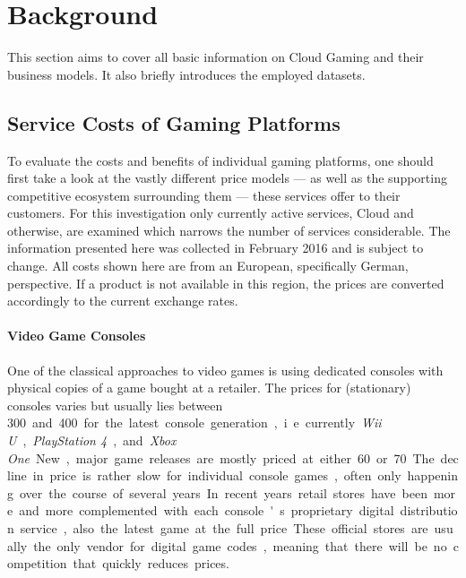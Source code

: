 \section{Background}
\label{sec:background}

This section aims to cover all basic information on Cloud Gaming and their business models. It also briefly introduces the employed datasets.

\subsection{Service Costs of Gaming Platforms}

To evaluate the costs and benefits of individual gaming platforms, one should first take a look at the vastly different price models --- as well as the supporting competitive ecosystem surrounding them --- these services offer to their customers. For this investigation only currently active services, Cloud and otherwise, are examined which narrows the number of services considerable. The information presented here was collected in February 2016 and is subject to change. All costs shown here are from an European, specifically German, perspective. If a product is not available in this region, the prices are converted accordingly to the current exchange rates.



\paragraph{Video Game Consoles}

One of the classical approaches to video games is using dedicated consoles with physical copies of a game bought at a retailer. The prices for (stationary) consoles varies but usually lies between \SI{300}[\EUR] and \SI{400}[\EUR] for the latest console generation, i.e. currently \textit{Wii U}, \textit{PlayStation 4}, and \textit{Xbox One}. New, major game releases are mostly priced at either \SI{60}[\EUR] or \SI{70}[\EUR]. The decline in price is rather slow for individual console games, often only happening over the course of several years.

In recent years retail stores have been more and more complemented with each console's proprietary digital distribution service, also the latest game at the full price. These official stores are usually the only vendor for digital game codes, meaning that there will be no competition that quickly reduces prices. 

